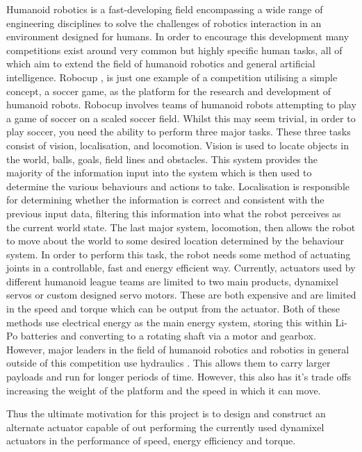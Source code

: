\documentclass[11pt,a4paper]{article}
\begin{document}
Humanoid robotics is a fast-developing field encompassing a wide range of engineering disciplines to solve the challenges of robotics interaction in an environment designed for humans. In order to encourage this development many competitions exist around very common but highly specific human tasks, all of which aim to extend the field of humanoid robotics and general artificial intelligence. Robocup \cite{kitano1995robocup}, is just one example of a competition utilising a simple concept, a soccer game, as the platform for the research and development of humanoid robots. Robocup involves teams of humanoid robots attempting to play a game of soccer on a scaled soccer field. Whilst this may seem trivial, in order to play soccer, you need the ability to perform three major tasks. These three tasks consist of vision, localisation, and locomotion. Vision is used to locate objects in the world, balls, goals, field lines and obstacles. This system provides the majority of the information input into the system which is then used to determine the various behaviours and actions to take. Localisation is responsible for determining whether the information is correct and consistent with the previous input data, filtering this information into what the robot perceives as the current world state. The last major system, locomotion, then allows the robot to move about the world to some desired location determined by the behaviour system. In order to perform this task, the robot needs some method of actuating joints in a controllable, fast and energy efficient way. Currently, actuators used by different humanoid league teams are limited to two main products, dynamixel servos \cite{robotis_mx106} or custom designed servo motors. These are both expensive and are limited in the speed and torque which can be output from the actuator. Both of these methods use electrical energy as the main energy system, storing this within Li-Po batteries and converting to a rotating shaft via a motor and gearbox. However, major leaders in the field of humanoid robotics and robotics in general outside of this competition use hydraulics \cite{atlas}. This allows them to carry larger payloads and run for longer periods of time. However, this also has it's trade offs increasing the weight of the platform and the speed in which it can move. \newline

Thus the ultimate motivation for this project is to design and construct an alternate actuator capable of out performing the currently used dynamixel actuators in the performance of speed, energy efficiency and torque. \newline
\end{document}
